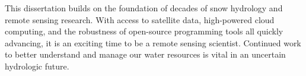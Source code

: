 This dissertation builds on the foundation of decades of snow hydrology and remote sensing research. With access to satellite data, high-powered cloud computing, and the robustness of open-source programming tools all quickly advancing, it is an exciting time to be a remote sensing scientist. Continued work to better understand and manage our water resources is vital in an uncertain hydrologic future.




